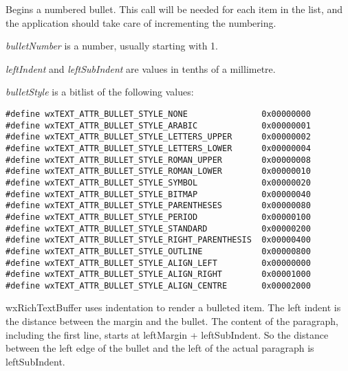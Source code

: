 \label{wxrichtextctrlbeginnumberedbullet}


Begins a numbered bullet. This call will be needed for each item in the list, and the
application should take care of incrementing the numbering.

{\it bulletNumber} is a number, usually starting with 1.

{\it leftIndent} and {\it leftSubIndent} are values in tenths of a millimetre.

{\it bulletStyle} is a bitlist of the following values:

{\small
\begin{verbatim}
#define wxTEXT_ATTR_BULLET_STYLE_NONE               0x00000000
#define wxTEXT_ATTR_BULLET_STYLE_ARABIC             0x00000001
#define wxTEXT_ATTR_BULLET_STYLE_LETTERS_UPPER      0x00000002
#define wxTEXT_ATTR_BULLET_STYLE_LETTERS_LOWER      0x00000004
#define wxTEXT_ATTR_BULLET_STYLE_ROMAN_UPPER        0x00000008
#define wxTEXT_ATTR_BULLET_STYLE_ROMAN_LOWER        0x00000010
#define wxTEXT_ATTR_BULLET_STYLE_SYMBOL             0x00000020
#define wxTEXT_ATTR_BULLET_STYLE_BITMAP             0x00000040
#define wxTEXT_ATTR_BULLET_STYLE_PARENTHESES        0x00000080
#define wxTEXT_ATTR_BULLET_STYLE_PERIOD             0x00000100
#define wxTEXT_ATTR_BULLET_STYLE_STANDARD           0x00000200
#define wxTEXT_ATTR_BULLET_STYLE_RIGHT_PARENTHESIS  0x00000400
#define wxTEXT_ATTR_BULLET_STYLE_OUTLINE            0x00000800
#define wxTEXT_ATTR_BULLET_STYLE_ALIGN_LEFT         0x00000000
#define wxTEXT_ATTR_BULLET_STYLE_ALIGN_RIGHT        0x00001000
#define wxTEXT_ATTR_BULLET_STYLE_ALIGN_CENTRE       0x00002000
\end{verbatim}
}

wxRichTextBuffer uses indentation to render a bulleted item. The left indent is the distance between
the margin and the bullet. The content of the paragraph, including the first line, starts
at leftMargin + leftSubIndent. So the distance between the left edge of the bullet and the
left of the actual paragraph is leftSubIndent.

\label{wxrichtextctrlbeginparagraphspacing}


